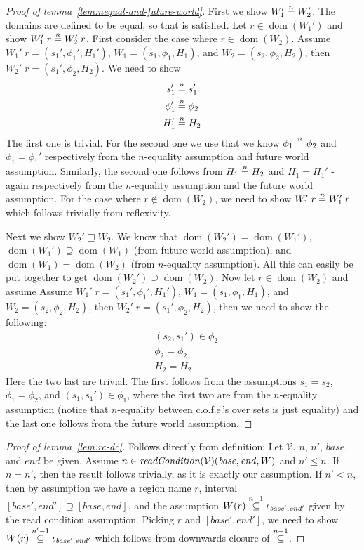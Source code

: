 \documentclass{article}
\newcommand{\nequal}[1][n]{\stackrel{\tiny{#1}}{=}}
\newcommand{\nsubeq}[1][n]{\stackrel{\tiny{#1}}{\subseteq}}
\DeclareMathOperator{\dom}{dom}
\newcommand{\cofe}{c.o.f.e.}
\newcommand{\cofes}{\cofe{}'s}
\newcommand{\var}[1]{\mathit{#1}}
\newcommand{\start}{\var{base}}
\newcommand{\addrend}{\var{end}}
\newcommand{\plainfun}[2]{
  \ifthenelse{\equal{#2}{}}
             {\mathit{#1}}
             {\mathit{#1}(#2)}
}
\newcommand{\readCond}[1]{\plainfun{readCondition}{#1}}
\newcommand{\future}{\mathbin{\sqsupseteq}}
\newcommand{\asmType}{\plaindom{AsmType}}
\newcommand{\plaindom}[1]{\mathrm{#1}}
\newcommand{\intr}[2]{\mathcal{#1}}
\newcommand{\valueintr}[1]{\intr{V}{#1}}
\newcommand{\stdvr}{\valueintr{\asmType}}
\begin{document}
\begin{appendices}
\begin{proof}[Proof of lemma~\ref{lem:nequal-and-future-world}]
First we show $W_1' \nequal W_2'$. The domains are defined to be equal, so that is satisfied. Let $r \in \dom(W_1')$ and show $W_1' \; r \nequal W_2' \; r$. First consider the case where $r \in \dom(W_2)$. Assume $W_1' \; r = (s_1',\phi_1',H_1')$, $W_1 = (s_1,\phi_1,H_1)$, and $W_2 = (s_2,\phi_2,H_2)$, then $W_2' \; r = (s_1',\phi_2,H_2)$. We need to show
\begin{align*}
  s_1' & \nequal s_1' \\
  \phi_1' & \nequal \phi_2 \\
  H_1' & \nequal H_2
\end{align*}
The first one is trivial. For the second one we use that we know $\phi_1 \nequal \phi_2$ and $\phi_1 = \phi_1'$ respectively from the $n$-equality assumption and future world assumption. Similarly, the second one follows from $H_1 \nequal H_2$ and $H_1 = H_1'$ - again respectively from the $n$-equality assumption and the future world assumption. For the case where $r \not\in \dom(W_2)$, we need to show $W_1' \; r \nequal W_1' \; r$ which follows trivially from reflexivity.

Next we show $W_2' \future W_2$. We know that $\dom(W_2') = \dom(W_1')$, $\dom(W_1') \supseteq \dom(W_1)$ (from future world assumption), and $\dom(W_1) = \dom(W_2)$ (from $n$-equality assumption). All this can easily be put together to get $\dom(W_2') \supseteq \dom(W_2)$. Now let $r\in \dom(W_2)$ and assume Assume $W_1' \; r = (s_1',\phi_1',H_1')$, $W_1 = (s_1,\phi_1,H_1)$, and $W_2 = (s_2,\phi_2,H_2)$, then $W_2' \; r = (s_1',\phi_2,H_2)$, then we need to show the following:
\begin{align*}
  &(s_2,s_1') \in \phi_2 \\
  &\phi_2 = \phi_2 \\
  &H_2 = H_2
\end{align*}
Here the two last are trivial. The first follows from the assumptions $s_1 = s_2$, $\phi_1 = \phi_2$, and $(s_1,s_1') \in \phi_1$, where the first two are from the $n$-equality assumption (notice that $n$-equality between \cofes{} over sets is just equality) and the last one follows from the future world assumption.
\end{proof}

\begin{proof}[Proof of lemma~\ref{lem:rc-dc}]
  Follows directly from definition: Let $\stdvr$, $n$, $n'$, $\start$, and  $\addrend$ be given. Assume $n \in \readCond{}(\stdvr)(\start,\addrend,W)$ and $n' \leq n$. If $n=n'$, then the result follows trivially, as it is exactly our assumption. If $n' < n$, then by assumption we have a region name $r$, interval $[\start',\addrend'] \supseteq [\start,\addrend]$, and the assumption $W(r) \nsubeq[n-1] \iota_{\start',\addrend'}$  given by the read condition assumption. Picking $r$ and $[\start',\addrend']$, we need to show  $W(r) \nsubeq[n'-1] \iota_{\start',\addrend'}$ which follows from downwards closure of $\nsubeq[n-1]$.
\end{proof}


\end{appendices}
\end{document}
